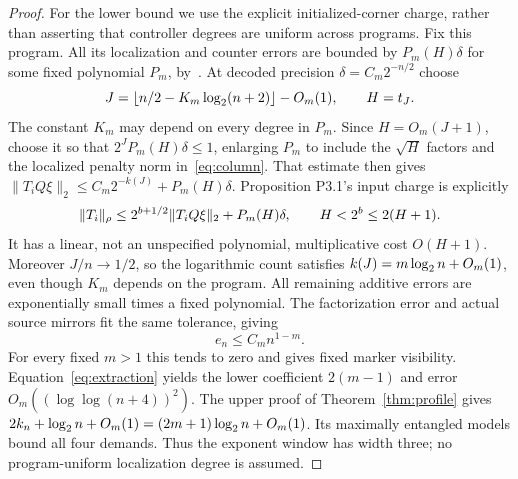 \begin{proof}
For the lower bound we use the explicit initialized-corner charge, rather than asserting that controller degrees are uniform across programs. Fix this program. All its localization and counter errors are bounded by $P_m(H)\delta$ for some fixed polynomial $P_m$, by~\cite[Propositions P3.1, P4.2 and P5.1]{UP}. At decoded precision $\delta=C_m2^{-n/2}$ choose
\[
 J=\lfloor n/2-K_m\log_2(n+2)\rfloor-O_m(1),\qquad H=t_J.
\]
The constant $K_m$ may depend on every degree in $P_m$. Since $H=O_m(J+1)$, choose it so that $2^JP_m(H)\delta\le1$, enlarging $P_m$ to include the $\sqrt H$ factors and the localized penalty norm in~\eqref{eq:column}. That estimate then gives $\|T_iQ\xi\|_2\le C_m2^{-k(J)}+P_m(H)\delta$. Proposition P3.1's input charge is explicitly
\[
 \lVert T_i\rVert_\rho\le 2^{b+1/2}\|T_iQ\xi\|_2+P_m(H)\delta,
 \qquad H<2^b\le2(H+1).
\]
It has a linear, not an unspecified polynomial, multiplicative cost $O(H+1)$. Moreover $J/n\to1/2$, so the logarithmic count satisfies $k(J)=m\log_2 n+O_m(1)$, even though $K_m$ depends on the program. All remaining additive errors are exponentially small times a fixed polynomial. The factorization error and actual source mirrors fit the same tolerance, giving
\[
 e_n\le C_m n^{1-m}.
\]
For every fixed $m>1$ this tends to zero and gives fixed marker visibility. Equation~\eqref{eq:extraction} yields the lower coefficient $2(m-1)$ and error $O_m((\log\log(n+4))^2)$. The upper proof of Theorem~\ref{thm:profile} gives $2k_n+\log_2 n+O_m(1)=(2m+1)\log_2 n+O_m(1)$. Its maximally entangled models bound all four demands. Thus the exponent window has width three; no program-uniform localization degree is assumed.
\end{proof}

